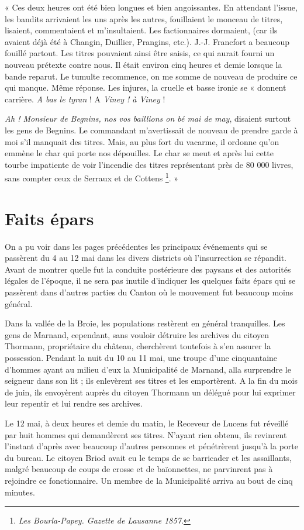 \documentclass[french,twoside]{book} %
\newenvironment{quoteblock}%
  {\begin{quoting}}
  {\end{quoting}}
\newenvironment{quotebar}{%
    \def\FrameCommand{{\color{rubric!10!}\vrule width 0.5em} \hspace{0.9em}}%
    \def\OuterFrameSep{\itemsep} %
    \MakeFramed {\advance\hsize-\width \FrameRestore}
  }%
  {%
    \endMakeFramed
  }
\renewenvironment{quoteblock}%
  {%
    \savenotes
    \setstretch{0.9}
    \begin{quotebar}
  }
  {%
    \end{quotebar}
    \spewnotes
  }
\begin{document}
\begin{quoteblock}
 « Ces deux heures ont été bien longues et bien angoissantes. En attendant l’issue, les bandits arrivaient les uns après les autres, fouillaient le monceau de titres, lisaient, commentaient et m’insultaient. Les factionnaires dormaient, (car ils avaient déjà été à Changin, Duillier, Prangins, etc.). J.-J. Francfort a beaucoup fouillé partout. Les titres pouvaient ainsi être saisis, ce qui aurait fourni un nouveau prétexte contre nous. Il était environ cinq heures et demie lorsque la bande reparut. Le tumulte recommence, on me somme de nouveau de produire ce qui manque. Même réponse. Les injures, la cruelle et basse ironie se « donnent carrière. \emph{A bas le tyran} ! A \emph{Viney ! à Viney} !\par
 \emph{Ah ! Monsieur de Begnins, nos vos baillions on bé mai de may}, disaient surtout les gens de Begnins. Le commandant m’avertissait de nouveau de prendre garde à moi s’il manquait des titres. Mais, au plus fort du vacarme, il ordonne qu’on emmène le char qui porte nos dépouilles. Le char se meut et après lui cette tourbe impatiente de voir l’incendie des titres représentant près de 80 000 livres, sans compter ceux de Serraux et de Cottens \footnote{\emph{Les Bourla-Papey. Gazette de Lausanne 1857.}}. »
 \end{quoteblock}

\section[Faits épars]{Faits épars}
\noindent On a pu voir dans les pages précédentes les principaux événements qui se passèrent du 4 au 12 mai dans les divers districts où l’insurrection se répandit. Avant de montrer quelle fut la conduite postérieure des paysans et des autorités légales de l’époque, il ne sera pas inutile d’indiquer les quelques faits épars qui se passèrent dans d’autres parties du Canton où le mouvement fut beaucoup moins général.\par
Dans la vallée de la Broie, les populations restèrent en général tranquilles. Les gens de Marnand, cependant, sans vouloir détruire les archives du citoyen Thormann, propriétaire du château, cherchèrent toutefois à s’en assurer la possession. Pendant la nuit du 10 au 11 mai, une troupe d’une cinquantaine d’hommes ayant au milieu d’eux la Municipalité de Marnand, alla surprendre le seigneur dans son lit ; ils enlevèrent ses titres et les emportèrent. A la fin du mois de juin, ils envoyèrent auprès du citoyen Thormann un délégué pour lui exprimer leur repentir et lui rendre ses archives.\par
Le 12 mai, à deux heures et demie du matin, le Receveur de Lucens fut réveillé par huit hommes qui demandèrent ses titres. N’ayant rien obtenu, ils revinrent l’instant d’après avec beaucoup d’autres personnes et pénétrèrent jusqu’à la porte du bureau. Le citoyen Briod avait eu le temps de se barricader et les assaillants, malgré beaucoup de coups de crosse et de baïonnettes, ne parvinrent pas à rejoindre ce fonctionnaire. Un membre de la Municipalité arriva au bout de cinq minutes.\par
\end{document}
